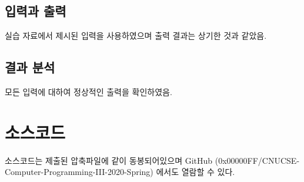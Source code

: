 \documentclass[UTF8]{report}
\begin{document}
        \newpage
        \newpage

        \section{입력과 출력}
            실습 자료에서 제시된 입력을 사용하였으며 출력 결과는 상기한 것과 같았음.
        \section{결과 분석}
            모든 입력에 대하여 정상적인 출력을 확인하였음.

    \chapter{소스코드}
        소스코드는 제출된 압축파일에 같이 동봉되어있으며 GitHub (0x00000FF/CNUCSE-Computer-Programming-III-2020-Spring) 에서도 열람할 수 있다.
\end{document}
